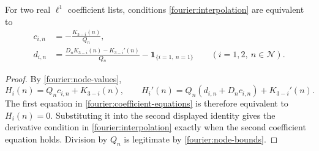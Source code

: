 \begin{lemma}\label{fourier:equivalence}
For two real \(\ell^1\) coefficient lists, conditions
\eqref{fourier:interpolation} are equivalent to
\begin{equation}\label{fourier:coefficient-equations}
 \begin{split}
 c_{i,n}&=-\frac{K_{3-i}(n)}{Q_n},\\
 d_{i,n}&=\frac{D_nK_{3-i}(n)-K_{3-i}'(n)}{Q_n}
          -\mathbf1_{\{i=1,\ n=1\}}
 \qquad(i=1,2,\ n\in\mathcal N).
 \end{split}
\end{equation}
\end{lemma}

\begin{proof}
By \eqref{fourier:node-values},
\[
 H_i(n)=Q_nc_{i,n}+K_{3-i}(n),\qquad
 H_i'(n)=Q_n(d_{i,n}+D_nc_{i,n})+K_{3-i}'(n).
\]
The first equation in \eqref{fourier:coefficient-equations} is therefore
equivalent to \(H_i(n)=0\).  Substituting it into the second displayed
identity gives the derivative condition in
\eqref{fourier:interpolation} exactly when the second coefficient equation
holds.  Division by \(Q_n\) is legitimate by
\eqref{fourier:node-bounds}.
\end{proof}
